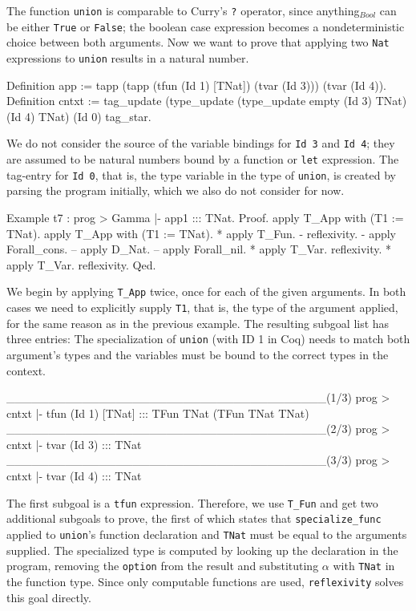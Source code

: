 \documentclass[paper = a4, fleqn, twoside]{scrreprt}
\newcommand{\coqinline}[1]{\texttt{#1}}
\begin{document}
The function \texttt{union} is comparable to Curry's \texttt{?} operator, since anything$_{Bool}$ can be either \texttt{True} or \texttt{False}; the boolean case expression becomes a nondeterministic choice between both arguments. Now we want to prove that applying two \texttt{Nat} expressions to \texttt{union} results in a natural number. 
\begin{coqcode}
Definition app := tapp
                     (tapp (tfun (Id 1) [TNat])
                           (tvar (Id 3)))
                     (tvar (Id 4)).
Definition cntxt := tag_update
                      (type_update
                        (type_update empty (Id 3) TNat)
                      (Id 4) TNat)
                    (Id 0) tag_star.
\end{coqcode}
We do not consider the source of the variable bindings for \texttt{Id 3} and \texttt{Id 4}; they are assumed to be natural numbers bound by a function or \texttt{let} expression. The tag-entry for \texttt{Id 0}, that is, the type variable in the type of \texttt{union}, is created by parsing the program initially, which we also do not consider for now.
\newpage
\begin{coqcode}    
Example t7 : prog > Gamma |- app1 ::: TNat.              
Proof.
 apply T_App with (T1 := TNat). apply T_App with (T1 := TNat).
   * apply T_Fun.
     - reflexivity.
     - apply Forall_cons.
       -- apply D_Nat.
       -- apply Forall_nil.
   * apply T_Var. reflexivity.
   * apply T_Var. reflexivity.
Qed.
\end{coqcode}
We begin by applying \coqinline{T_App} twice, once for each of the given arguments. In both cases we need to explicitly supply \coqinline{T1}, that is, the type of the argument applied, for the same reason as in the previous example. The resulting subgoal list has three entries: The specialization of \texttt{union} (with ID 1 in Coq) needs to match both argument's types and the variables must be bound to the correct types in the context. 
\begin{coqcode}
______________________________________(1/3)
prog > cntxt |- tfun (Id 1) [TNat] ::: TFun TNat (TFun TNat TNat)
______________________________________(2/3)
prog > cntxt |- tvar (Id 3) ::: TNat
______________________________________(3/3)
prog > cntxt |- tvar (Id 4) ::: TNat
\end{coqcode}
The first subgoal is a \coqinline{tfun} expression. Therefore, we use \coqinline{T_Fun} and get two additional subgoals to prove, the first of which states that \coqinline{specialize_func} applied to \texttt{union}'s function declaration and \texttt{TNat} must be equal to the arguments supplied. The specialized type is computed by looking up the declaration in the program, removing the \coqinline{option} from the result and substituting $\alpha$ with \coqinline{TNat} in the function type. Since only computable functions are used, \coqinline{reflexivity} solves this goal directly.
\end{document}
